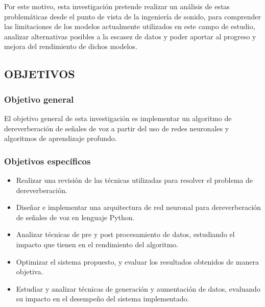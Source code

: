 Por este motivo, esta investigación pretende realizar un análisis de estas problemáticas desde el punto de vista de la ingeniería de sonido, para comprender las limitaciones de los modelos actualmente utilizados en este campo de estudio, analizar alternativas posibles a la escasez de datos y poder aportar al progreso y mejora del rendimiento de dichos modelos. 

\subsection[Objetivos]{OBJETIVOS}
\subsubsection{Objetivo general}

El objetivo general de esta investigación es implementar un algoritmo de dereverberación de señales de voz a partir del uso de redes neuronales y algoritmos de aprendizaje profundo. 

\subsubsection{Objetivos específicos}

\begin{itemize}
    \item Realizar una revisión de las técnicas utilizadas para resolver el problema de dereverberación.
    \item Diseñar e implementar una arquitectura de red neuronal para dereverberación de señales de voz en lenguaje Python.
    \item Analizar técnicas de pre y post procesamiento de datos, estudiando el impacto que tienen en el rendimiento del algoritmo.
    \item Optimizar el sistema propuesto, y evaluar los resultados obtenidos de manera objetiva.
    \item Estudiar y analizar técnicas de generación y aumentación de datos, evaluando su impacto en el desempeño del sistema implementado. 
\end{itemize}

